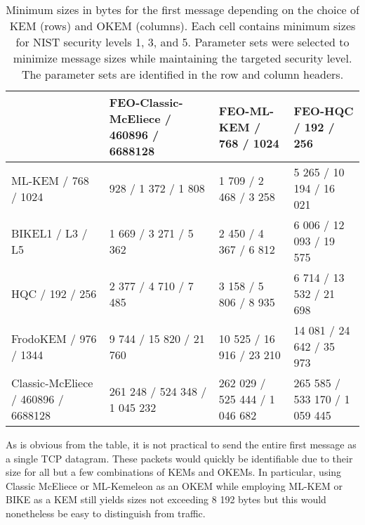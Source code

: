 \begin{table}
    \centering \scriptsize
    \begin{tabular}{@{} L{0.25\textwidth-\tabcolsep} | L{0.25\tabcolsep} L{0.25\tabcolsep} L{0.25\textwidth-\tabcolsep} @{}}
        & FEO-Classic-McEliece / 460896 / 6688128
        & FEO-ML-KEM / 768 / 1024
        & FEO-HQC / 192 / 256
        \\ \hline
    ML-KEM / 768 / 1024
        & 928 / 1 372 / 1 808
        & 1 709 / 2 468 / 3 258
        & 5 265 / 10 194 / 16 021        \\
    BIKE\newline L1 / L3 / L5
        & 1 669 / 3 271 / 5 362
        & 2 450 / 4 367 / 6 812
        & 6 006 / 12 093 / 19 575        \\
    HQC / 192 / 256
        & 2 377 / 4 710 / 7 485
        & 3 158 / 5 806 / 8 935
        & 6 714 / 13 532 / 21 698        \\
    FrodoKEM / 976 / 1344
        & 9 744 / 15 820 / 21 760
        & 10 525 / 16 916 / 23 210
        & 14 081 / 24 642 / 35 973       \\
    Classic-McEliece / 460896 / 6688128
        & \tiny 261 248 / 524 348 / 1 045 232
        & \tiny 262 029 / 525 444 / 1 046 682
        & \tiny 265 585 / 533 170 / 1 059 445
    \end{tabular}
    \caption[
        Minimum sizes in bytes for the first \drivel{} message depending on the choice of KEM and OKEM
    ]{
        Minimum sizes in bytes for the first \drivel{} message depending on the choice of KEM (rows) and OKEM (columns). Each cell contains minimum sizes for NIST security levels 1, 3, and 5. Parameter sets were selected to minimize message sizes while maintaining the targeted security level. The parameter sets are identified in the row and column headers.
    }
    \label{tab:frag-msg-sizes}
\end{table}

As is obvious from the table, it is not practical to send the entire first \drivel{} message as a single TCP datagram. These packets would quickly be identifiable due to their size for all but a few combinations of KEMs and OKEMs. In particular, using Classic McEliece or ML-Kemeleon as an OKEM while employing ML-KEM or BIKE as a KEM still yields sizes not exceeding 8 192 bytes but this would nonetheless be easy to distinguish from \obfsfour{} traffic.

